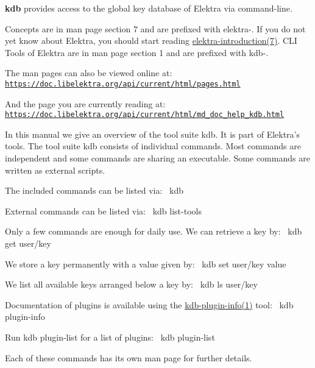 {\bfseries kdb} provides access to the global key database of Elektra via command-\/line.

Concepts are in man page section 7 and are prefixed with {\ttfamily elektra-\/}. If you do not yet know about Elektra, you should start reading \hyperlink{doc_help_elektra-introduction_md}{elektra-\/introduction(7)}. C\+LI Tools of Elektra are in man page section 1 and are prefixed with {\ttfamily kdb-\/}.

The man pages can also be viewed online at\+: \href{https://doc.libelektra.org/api/current/html/pages.html}{\tt https\+://doc.\+libelektra.\+org/api/current/html/pages.\+html}

And the page you are currently reading at\+: \href{https://doc.libelektra.org/api/current/html/md_doc_help_kdb.html}{\tt https\+://doc.\+libelektra.\+org/api/current/html/md\+\_\+doc\+\_\+help\+\_\+kdb.\+html}

In this manual we give an overview of the tool suite {\ttfamily kdb}. It is part of Elektra’s tools. The tool suite {\ttfamily kdb} consists of individual commands. Most commands are independent and some commands are sharing an executable. Some commands are written as external scripts.

The included commands can be listed via\+:~\newline
 {\ttfamily kdb}

External commands can be listed via\+:~\newline
 {\ttfamily kdb list-\/tools}

Only a few commands are enough for daily use. We can retrieve a key by\+:~\newline
 {\ttfamily kdb get user/key}

We store a key permanently with a value given by\+:~\newline
 {\ttfamily kdb set user/key value}

We list all available keys arranged below a key by\+:~\newline
 {\ttfamily kdb ls user/key}

Documentation of plugins is available using the \hyperlink{doc_help_kdb-plugin-info_md}{kdb-\/plugin-\/info(1)} tool\+:~\newline
 {\ttfamily kdb plugin-\/info}

Run {\ttfamily kdb plugin-\/list} for a list of plugins\+:~\newline
 {\ttfamily kdb plugin-\/list}

Each of these commands has its own man page for further details.

